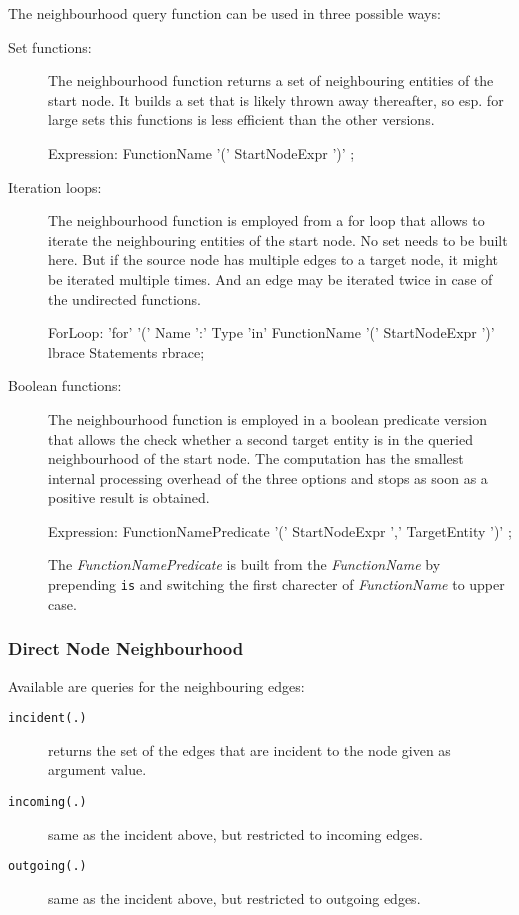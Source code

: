 The neighbourhood query function can be used in three possible ways: 
\begin{description}
	\item[Set functions:] The neighbourhood function returns a set of neighbouring entities of the start node. It builds a set that is likely thrown away thereafter, so esp. for large sets this functions is less efficient than the other versions.
\begin{rail}
Expression:
  FunctionName '(' StartNodeExpr ')' ;
\end{rail}
	\item[Iteration loops:] The neighbourhood function is employed from a for loop that allows to iterate the neighbouring entities of the start node. No set needs to be built here. But if the source node has multiple edges to a target node, it might be iterated multiple times. And an edge may be iterated twice in case of the undirected functions.
\begin{rail}
ForLoop: 
  'for' '(' Name ':' Type 'in' FunctionName '(' StartNodeExpr ')' \\ lbrace Statements rbrace;
\end{rail}
	\item[Boolean functions:] The neighbourhood function is employed in a boolean predicate version that allows the check whether a second target entity is in the queried neighbourhood of the start node. The computation has the smallest internal processing overhead of the three options and stops as soon as a positive result is obtained.
\begin{rail}
Expression:
  FunctionNamePredicate '(' StartNodeExpr ',' TargetEntity ')' ;
\end{rail}
The \emph{FunctionNamePredicate} is built from the \emph{FunctionName} by prepending \texttt{is} and switching the first charecter of \emph{FunctionName} to upper case.
\end{description}


\subsubsection*{Direct Node Neighbourhood}

Available are queries for the neighbouring edges:

\begin{description}
\item[\texttt{incident(.)}] returns the set of the edges that are incident to the node given as argument value.
\item[\texttt{incoming(.)}] same as the incident above, but restricted to incoming edges.
\item[\texttt{outgoing(.)}] same as the incident above, but restricted to outgoing edges.
\end{description}

